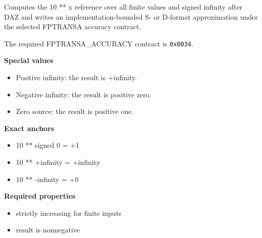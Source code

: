 Computes the 10 ** x reference over all finite values and signed infinity after DAZ and writes an implementation-bounded S- or D-format approximation under the selected FPTRANSA accuracy contract.

The required FPTRANSA\_ACCURACY contract is \texttt{0x0034}.

\textbf{Special values}\par
\begin{itemize}
\item Positive infinity: the result is +infinity.
\item Negative infinity: the result is positive zero.
\item Zero source: the result is positive one.
\end{itemize}

\textbf{Exact anchors}\par
\begin{itemize}
\item 10 ** signed 0 = +1
\item 10 ** +infinity = +infinity
\item 10 ** -infinity = +0
\end{itemize}

\textbf{Required properties}\par
\begin{itemize}
\item strictly increasing for finite inputs
\item result is nonnegative
\end{itemize}
